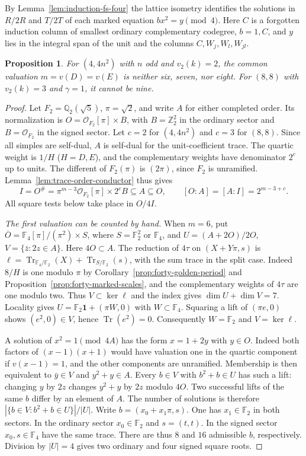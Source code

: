 \documentclass[11pt,reqno]{amsart}
\newtheorem{proposition}[theorem]{Proposition}
\theoremstyle{remark}\newtheorem{remark}[theorem]{Remark}
\numberwithin{equation}{section}
\begin{document}
By Lemma~\ref{lem:induction-fs-four} the lattice isometry identifies
the solutions in $R/2R$ and $T/2T$ of each marked equation
$bx^2=y\pmod4$. Here $C$ is a forgotten induction column of smallest ordinary
complementary codegree, $b=1,C$, and $y$ lies in the integral span
of the unit and the columns $C,W_j,W_l,W_{jl}$.
\begin{proposition}\label{prop:forty-local-orders}
For $(4,4n^2)$ with $n$ odd and $v_2(k)=2$, the common valuation
$m=v(D)=v(E)$ is neither six, seven, nor eight. For $(8,8)$ with
$v_2(k)=3$ and $\gamma=1$, it cannot be nine.
\end{proposition}
\begin{proof}
Let $F_2=\mathbb Q_2(\sqrt5)$, $\pi=\sqrt2$, and write $A$ for either
completed order. Its normalization is
$O=\mathcal O_{F_2}[\pi]\times B$, with $B=\mathbb Z_2^2$ in the
ordinary sector and $B=\mathcal O_{F_2}$ in the signed sector.
Let $c=2$ for $(4,4n^2)$ and $c=3$ for $(8,8)$.
Since all simples are self-dual, $A$ is self-dual for the
unit-coefficient trace. The quartic weight is $1/H$ ($H=D,E$), and the
complementary weights have denominator $2^c$ up to units. The
different of $F_2(\pi)$ is $(2\pi)$, since $F_2$ is unramified.
Lemma~\ref{lem:trace-order-conductor} thus gives
\[
 I=O^\#=\pi^{m-3}\mathcal O_{F_2}[\pi]\times2^cB
 \subseteq A\subseteq O,\qquad [O:A]=[A:I]=2^{m-3+c}.
\]
All square tests below take place in $O/4I$.

\smallskip\noindent\emph{The first valuation can be counted by hand.}
When $m=6$, put $\overline O=\mathbb F_4[\pi]/(\pi^2)\times S$,
where $S=\mathbb F_2^2$ or $\mathbb F_4$, and
$U=(A+2O)/2O$, $V=\{\bar z:2z\in A\}$. Here $4O\subset A$.
The reduction of $4\tau$ on $(X+Y\pi,s)$ is
$\ell=\operatorname{Tr}_{\mathbb F_4/\mathbb F_2}(X)+
\operatorname{Tr}_{S/\mathbb F_2}(s)$, with the sum trace in the split
case. Indeed $8/H$ is one modulo $\pi$ by
Corollary~\ref{prop:forty-golden-period} and Proposition~\ref{prop:forty-marked-scales},
and the complementary weights of $4\tau$ are one modulo two.
Thus $V\subset\ker\ell$ and the index gives $\dim U+\dim V=7$.
Locality gives $U=\mathbb F_2\mathbf1+(\pi W,0)$ with
$W\subset\mathbb F_4$. Squaring a lift of $(\pi e,0)$ shows
$(e^2,0)\in V$, hence $\operatorname{Tr}(e^2)=0$.
Consequently $W=\mathbb F_2$ and $V=\ker\ell$.

A solution of $x^2=1\pmod{4A}$ has the form $x=1+2y$ with $y\in O$.
Indeed both factors of $(x-1)(x+1)$ would have valuation one in the
quartic component if $v(x-1)=1$, and the other components are
unramified. Membership is then equivalent to $\bar y\in V$ and
$y^2+y\in A$. Every $b\in V$ with $b^2+b\in U$ has such a lift:
changing $y$ by $2z$ changes $y^2+y$ by $2z$ modulo $4O$.
Two successful lifts of the same $b$ differ by an element of $A$.
The number of solutions is therefore
$|\{b\in V:b^2+b\in U\}|/|U|$. Write $b=(x_0+x_1\pi,s)$. One has $x_1\in\mathbb F_2$ in both
sectors. In the ordinary sector $x_0\in\mathbb F_2$ and $s=(t,t)$.
In the signed sector $x_0,s\in\mathbb F_4$ have the same trace.
There are thus $8$ and $16$ admissible $b$, respectively. Division
by $|U|=4$ gives two ordinary and four signed square roots.


\end{proof}
\end{document}
